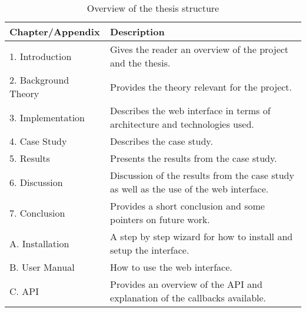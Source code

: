 \begin{table}[!h]
\begin{center}
\begin{tabular}{ | l | p{8cm} |}
\hline
\textbf{Chapter/Appendix} & \textbf{Description} \\ \hline
1. Introduction & Gives the reader an overview of the project and the thesis. \\ \hline
2. Background Theory & Provides the theory relevant for the project. \\ \hline
3. Implementation & Describes the web interface in terms of architecture and technologies used. \\ \hline
4. Case Study & Describes the case study. \\ \hline
5. Results & Presents the results from the case study. \\ \hline
6. Discussion & Discussion of the results from the case study as well as the use of the web interface. \\ \hline
7. Conclusion & Provides a short conclusion and some pointers on future work. \\ \hline
A. Installation & A step by step wizard for how to install and setup the interface. \\ \hline
B. User Manual & How to use the web interface. \\ \hline
C. API & Provides an overview of the API and explanation of the callbacks available. \\ \hline
\end{tabular}
\end{center}
\caption{Overview of the thesis structure}
\label{Tab1}
\end{table}

\cleardoublepage